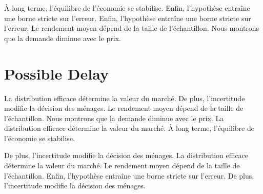 \documentclass[11pt]{article}
\begin{document}
À long terme, l'équilibre de l'économie se stabilise. Enfin, l'hypothèse entraîne une borne stricte sur l'erreur. Enfin, l'hypothèse entraîne une borne stricte sur l'erreur. Le rendement moyen dépend de la taille de l'échantillon. Nous montrons que la demande diminue avec le prix.

\section{Possible Delay}\label{sec:7}

La distribution efficace détermine la valeur du marché. De plus, l'incertitude modifie la décision des ménages. Le rendement moyen dépend de la taille de l'échantillon. Nous montrons que la demande diminue avec le prix. La distribution efficace détermine la valeur du marché. À long terme, l'équilibre de l'économie se stabilise.

De plus, l'incertitude modifie la décision des ménages. La distribution efficace détermine la valeur du marché. Le rendement moyen dépend de la taille de l'échantillon. Enfin, l'hypothèse entraîne une borne stricte sur l'erreur. De plus, l'incertitude modifie la décision des ménages.
\end{document}
